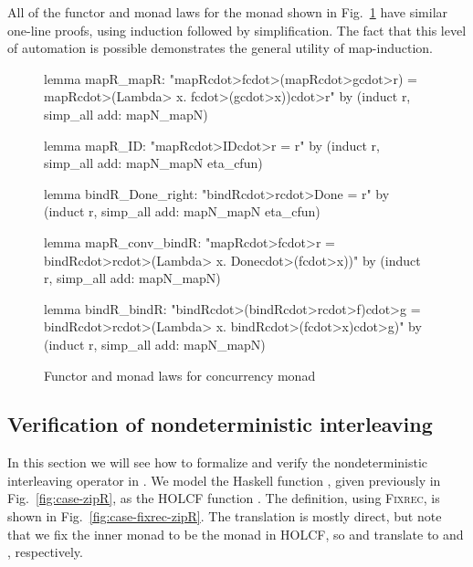 All of the functor and monad laws for the  monad shown in Fig.~\ref{fig:R-functor-monad} have similar one-line proofs, using induction followed by simplification. The fact that this level of automation is possible demonstrates the general utility of map-induction.

\begin{figure}
\begin{isacode}
lemma mapR_mapR: "mapR\<cdot>f\<cdot>(mapR\<cdot>g\<cdot>r) = mapR\<cdot>(\<Lambda> x. f\<cdot>(g\<cdot>x))\<cdot>r"
  by (induct r, simp_all add: mapN_mapN)
\end{isacode}
\unmedskip
{}
\begin{isacode}
lemma mapR_ID: "mapR\<cdot>ID\<cdot>r = r"
  by (induct r, simp_all add: mapN_mapN eta_cfun)
\end{isacode}
\unmedskip
{}
\begin{isacode}
lemma bindR_Done_right: "bindR\<cdot>r\<cdot>Done = r"
  by (induct r, simp_all add: mapN_mapN eta_cfun)
\end{isacode}
\unmedskip
{}
\begin{isacode}
lemma mapR_conv_bindR: "mapR\<cdot>f\<cdot>r = bindR\<cdot>r\<cdot>(\<Lambda> x. Done\<cdot>(f\<cdot>x))"
  by (induct r, simp_all add: mapN_mapN)
\end{isacode}
\unmedskip
{}
\begin{isacode}
lemma bindR_bindR: "bindR\<cdot>(bindR\<cdot>r\<cdot>f)\<cdot>g = bindR\<cdot>r\<cdot>(\<Lambda> x. bindR\<cdot>(f\<cdot>x)\<cdot>g)"
  by (induct r, simp_all add: mapN_mapN)
\end{isacode}

\caption{Functor and monad laws for concurrency monad}
\label{fig:R-functor-monad}
\end{figure}

\subsection{Verification of nondeterministic interleaving}
\label{sec:case-zipR}

In this section we will see how to formalize and verify the nondeterministic interleaving operator in . We model the Haskell function , given previously in Fig.~\ref{fig:case-zipR}, as the HOLCF function . The definition, using \textsc{Fixrec}, is shown in Fig.~\ref{fig:case-fixrec-zipR}. The translation is mostly direct, but note that we fix the inner monad  to be the  monad in HOLCF, so  and \hs{(|+|)} translate to  and , respectively.

